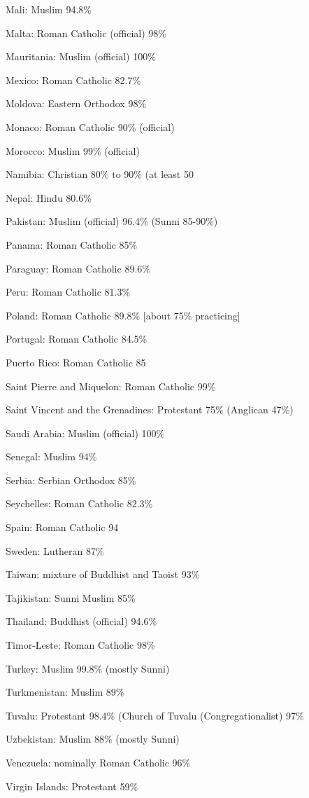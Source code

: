 \documentclass[letterpaper]{article}
\begin{document}
\begin{enumerate}
Mali: Muslim 94.8\%

Malta: Roman Catholic (official) 98\%

Mauritania: Muslim (official) 100\%

Mexico: Roman Catholic 82.7\%

Moldova: Eastern Orthodox 98\%

Monaco: Roman Catholic 90\% (official)

Morocco: Muslim 99\% (official)

Namibia: Christian 80\% to 90\% (at least 50%

Nepal: Hindu 80.6\%

Pakistan: Muslim (official) 96.4\% (Sunni 85-90\%)

Panama: Roman Catholic 85\%

Paraguay: Roman Catholic 89.6\%

Peru: Roman Catholic 81.3\%

Poland: Roman Catholic 89.8\% [about 75\% practicing]

Portugal: Roman Catholic 84.5\%

Puerto Rico: Roman Catholic 85%

Saint Pierre and Miquelon: Roman Catholic 99\%

Saint Vincent and the Grenadines: Protestant 75\% (Anglican 47\%)

Saudi Arabia: Muslim (official) 100\%

Senegal: Muslim 94\%

Serbia: Serbian Orthodox 85\%

Seychelles: Roman Catholic 82.3\%

Spain: Roman Catholic 94%

Sweden: Lutheran 87\%

Taiwan: mixture of Buddhist and Taoist 93\%

Tajikistan: Sunni Muslim 85\%

Thailand: Buddhist (official) 94.6\%

Timor-Leste: Roman Catholic 98\%

Turkey: Muslim 99.8\% (mostly Sunni)

Turkmenistan: Muslim 89\%

Tuvalu: Protestant 98.4\% (Church of Tuvalu (Congregationalist) 97\%

Uzbekistan: Muslim 88\% (mostly Sunni)

Venezuela: nominally Roman Catholic 96\%

Virgin Islands: Protestant 59\%


\end{enumerate}
\end{document}

